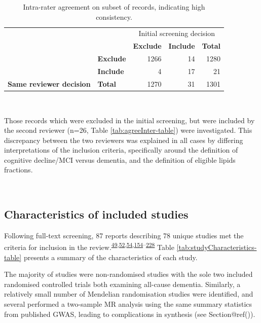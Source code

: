 \documentclass[a4paper, twoside]{templates/ociamthesis}
\begin{document}
\begin{table}[H]

\caption[Inter-rater agreement]{\label{tab:agreeIntra-table}Intra-rater agreement on subset of records, indicating high consistency.}
\centering
\begin{tabular}[t]{>{}l>{}lr>{}r|r}
\toprule
\multicolumn{2}{c}{ } & \multicolumn{3}{c}{Initial screening decision} \\
\cmidrule(l{3pt}r{3pt}){3-5}
\textbf{} & \textbf{} & \textbf{Exclude} & \textbf{Include} & \textbf{Total}\\
\midrule
 & \textbf{Exclude} & 1266 & 14 & 1280\\
\cmidrule{2-5}
 & \textbf{Include} & 4 & 17 & 21\\
\cmidrule{2-5}
\multirow{-3}{*}{\raggedright\arraybackslash \textbf{Same reviewer decision}} & \textbf{Total} & 1270 & 31 & 1301\\
\bottomrule
\end{tabular}
\end{table}

~

Those records which were excluded in the initial screening, but were included by the second reviewer (n=26, Table \ref{tab:agreeInter-table}) were investigated. This discrepancy between the two reviewers was explained in all cases by differing interpretations of the inclusion criteria, specifically around the definition of cognitive decline/MCI versus dementia, and the definition of eligible lipids fractions.

~

\hypertarget{characteristics-of-included-studies}{%
\subsection{Characteristics of included studies}\label{characteristics-of-included-studies}}

Following full-text screening, 87 reports describing 78 unique studies met the criteria for inclusion in the review.\textsuperscript{\protect\hyperlink{ref-li2005a}{49},\protect\hyperlink{ref-tan2003a}{52},\protect\hyperlink{ref-reitz2004a}{54},\protect\hyperlink{ref-ancelin2012a}{154}--\protect\hyperlink{ref-zimetbaum1992}{228}} Table \ref{tab:studyCharacteristics-table} presents a summary of the characteristics of each study.

The majority of studies were non-randomised studies with the sole two included randomised controlled trials both examining all-cause dementia. Similarly, a relatively small number of Mendelian randomisation studies were identified, and several performed a two-sample MR analysis using the same summary statistics from published GWAS, leading to complications in synthesis (see Section@ref()).
\end{document}
